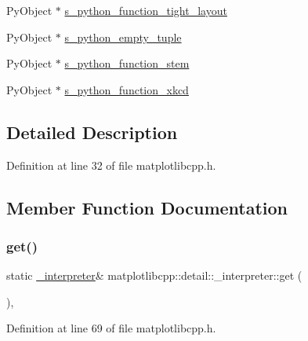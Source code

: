 \begin{DoxyCompactItemize}
\item 
Py\+Object $\ast$ \mbox{\hyperlink{structmatplotlibcpp_1_1detail_1_1__interpreter_a72965ea88b282bf62b41ca126341d9a8}{s\+\_\+python\+\_\+function\+\_\+tight\+\_\+layout}}
\item 
Py\+Object $\ast$ \mbox{\hyperlink{structmatplotlibcpp_1_1detail_1_1__interpreter_aaedba936be3a7e8fbcc528991ccace2c}{s\+\_\+python\+\_\+empty\+\_\+tuple}}
\item 
Py\+Object $\ast$ \mbox{\hyperlink{structmatplotlibcpp_1_1detail_1_1__interpreter_a37ac2b6b54f49af43a82115e0d752f98}{s\+\_\+python\+\_\+function\+\_\+stem}}
\item 
Py\+Object $\ast$ \mbox{\hyperlink{structmatplotlibcpp_1_1detail_1_1__interpreter_ac94dda0fc02bf1c7c4af3759c46ea8d7}{s\+\_\+python\+\_\+function\+\_\+xkcd}}
\end{DoxyCompactItemize}


\subsection{Detailed Description}


Definition at line 32 of file matplotlibcpp.\+h.



\subsection{Member Function Documentation}
\mbox{\label{structmatplotlibcpp_1_1detail_1_1__interpreter_a3ddc4e50c23738307da3dc64c47cdbc0}} 
\subsubsection{\texorpdfstring{get()}{get()}}
{\footnotesize\ttfamily static \mbox{\hyperlink{structmatplotlibcpp_1_1detail_1_1__interpreter}{\+\_\+interpreter}}\& matplotlibcpp\+::detail\+::\+\_\+interpreter\+::get (\begin{DoxyParamCaption}{ }\end{DoxyParamCaption})\hspace{0.3cm}{\ttfamily [inline]}, {\ttfamily [static]}}



Definition at line 69 of file matplotlibcpp.\+h.



